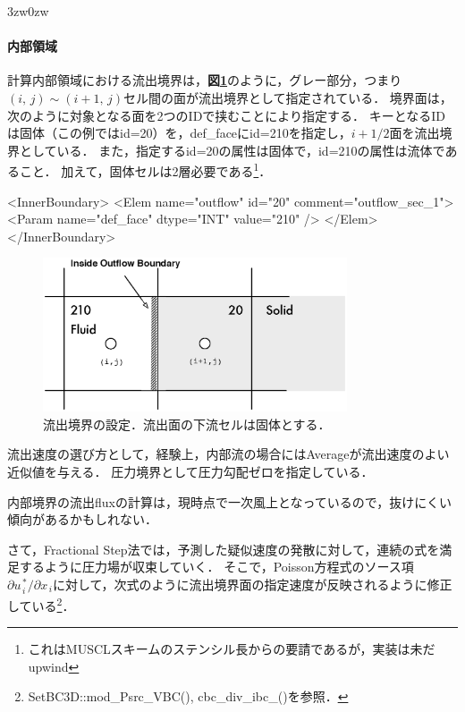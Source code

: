 \begin{indentation}{3zw}{0zw}
\paragraph{内部領域}
計算内部領域における流出境界は，\textbf{図\ref{fig:outflow BC inner}}のように，グレー部分，つまり$(i,\,j)\sim(i+1,\,j)$セル間の面が流出境界として指定されている．
境界面は，次のように対象となる面を2つのIDで挟むことにより指定する．
キーとなるIDは固体（この例ではid=20）を，def\_faceにid=210を指定し，$i+1/2$面を流出境界としている．
また，指定するid=20の属性は固体で，id=210の属性は流体であること．
加えて，固体セルは2層必要である\footnote{これはMUSCLスキームのステンシル長からの要請であるが，実装は未だupwind}．

{ \small
\begin{program}
<InnerBoundary>
  <Elem name="outflow" id="20" comment="outflow_sec_1">
    <Param name="def_face"      dtype="INT"    value="210" />
  </Elem>
</InnerBoundary>
\end{program}
}

\begin{figure}[htbp]
\begin{center}
\includegraphics[width=9cm,clip]{outflowBC_inner.eps}
\end{center}
\caption{流出境界の設定．流出面の下流セルは固体とする．}
\label{fig:outflow BC inner}
\end{figure}

\noindent 流出速度の選び方として，経験上，内部流の場合にはAverageが流出速度のよい近似値を与える．
圧力境界として圧力勾配ゼロを指定している．

内部境界の流出fluxの計算は，現時点で一次風上となっているので，抜けにくい傾向があるかもしれない．


さて，Fractional Step法では，予測した疑似速度の発散に対して，連続の式を満足するように圧力場が収束していく．
そこで，Poisson方程式のソース項$\partial u_{\,i}^{\,*}/\partial x_{\,i}$に対して，次式のように流出境界面の指定速度が反映されるように修正している\footnote{SetBC3D::mod\_Psrc\_VBC(), cbc\_div\_ibc\_()を参照．}．


\end{indentation}
